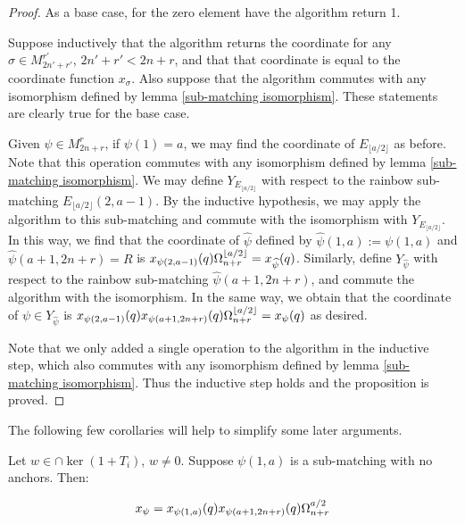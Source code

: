 \documentclass{amsart}
\begin{document}
\begin{proof}
 	As a base case, for the zero element have the algorithm return 1.
 	
 	Suppose inductively that the algorithm returns the coordinate for any $\sigma\in M_{2n'+r'}^{r'}$, $2n'+r'<2n+r$, and that that coordinate is equal to the coordinate function $x_\sigma$. Also suppose that the algorithm commutes with any isomorphism defined by lemma \ref{sub-matching isomorphism}. These statements are clearly true for the base case. 
 	
 	Given $\psi\in M_{2n+r}^r$, if $\psi(1)=a$, we may find the coordinate of $E_{\lfloor a/2\rfloor}$ as before. Note that this operation commutes with any isomorphism defined by lemma \ref{sub-matching isomorphism}. We may define $Y_{E_{\lfloor a/2\rfloor}}$ with respect to the rainbow sub-matching $E_{\lfloor a/2\rfloor}(2,a-1)$. By the inductive hypothesis, we may apply the algorithm to this sub-matching and commute with the isomorphism with $Y_{E_{\lfloor a/2\rfloor}}$. In this way, we find that the coordinate of $\widehat{\psi}$ defined by $\widehat{\psi}(1,a):=\psi(1,a)$ and $\widehat{\psi}(a+1,2n+r)=R$ is $x_{\psi(2,a-1)}(q)\Omega^{\lfloor a/2\rfloor}_{n+r}=x_{\widehat{\psi}}(q)$. Similarly, define $Y_{\widehat{\psi}}$ with respect to the rainbow sub-matching $\widehat{\psi}(a+1,2n+r)$, and commute the algorithm with the isomorphism. In the same way, we obtain that the coordinate of $\psi\in Y_{\widehat{\psi}}$ is $x_{\psi(2,a-1)}(q)x_{\psi(a+1,2n+r)}(q)\Omega^{\lfloor a/2\rfloor}_{n+r}=x_\psi(q)$ as desired.
 	
 	Note that we only added a single operation to the algorithm in the inductive step, which also commutes with any isomorphism defined by lemma \ref{sub-matching isomorphism}. Thus the inductive step holds and the proposition is proved.
 	
 	
 \end{proof}
 
 \vspace{5mm}
 The following few corollaries will help to simplify some later arguments.
 
 \begin{corollary}
 	Let $w\in\cap\ker(1+T_i)$, $w\not=0$. Suppose $\psi(1,a)$ is a sub-matching with no anchors. Then:
 	
 	$$x_\psi=x_{\psi(1,a)}(q)x_{\psi(a+1,2n+r)}(q)\Omega^{a/2}_{n+r}$$
 	
 	\label{characterization generalization}
 \end{corollary}
 
\end{document}
